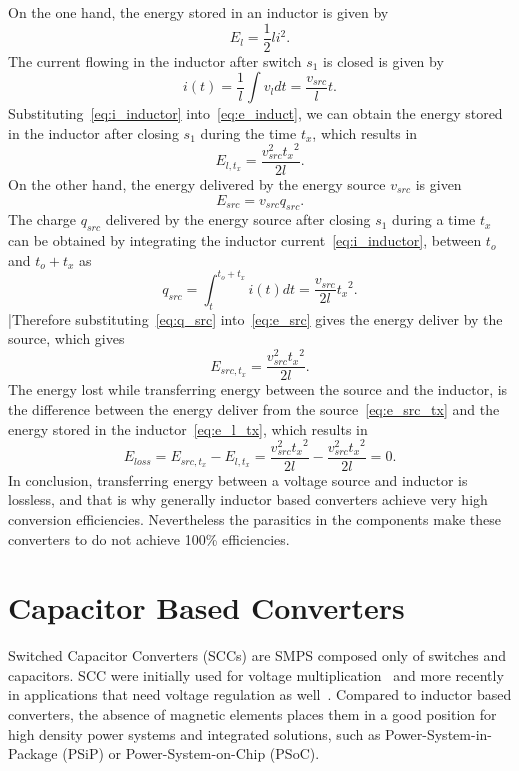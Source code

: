 On the one hand, the energy stored in an inductor is given by
\begin{equation}
E_l = \frac{1}{2} l i^2.
\label{eq:e_induct}
\end{equation}
The current flowing in the inductor after switch $s_1$ is closed is given by
\begin{equation}
i(t)= \frac{1}{l} \int v_l dt = \frac{v_{src}}{l}t.
\label{eq:i_inductor}
\end{equation}
Substituting~\eqref{eq:i_inductor} into~\eqref{eq:e_induct}, we can obtain the energy stored in the inductor after closing $s_1$ during the time $t_x$, which results in
\begin{equation}
E_{l,t_x}= \frac{v_{src}^2{t_x}^2}{2l} .
\label{eq:e_l_tx}
\end{equation}
On the other hand, the energy delivered by the energy source $v_{src}$ is given
\begin{equation}
E_{src} = v_{src} q_{src}.
\label{eq:e_src}
\end{equation}
The charge $q_{src}$ delivered by the energy source after closing $s_1$ during a time $t_x$ can be obtained by integrating the inductor current~\eqref{eq:i_inductor},  between $t_o$ and $t_o+t_x$ as
\begin{equation}
q_{src} = \int_t^{t_o+t_x} i(t) dt = \frac{v_{src}}{2l}{t_x}^2 .
\label{eq:q_src}
\end{equation}
|Therefore substituting~\eqref{eq:q_src} into~\eqref{eq:e_src} gives the energy deliver by the source, which gives
\begin{equation}
E_{src,t_x} = \frac{v_{src}^2{t_x}^2}{2l}.
\label{eq:e_src_tx}
\end{equation}
The energy lost while transferring energy between the source and the inductor, is the difference between the energy deliver from the source~\eqref{eq:e_src_tx} and the energy stored in the inductor~\eqref{eq:e_l_tx}, which results in
\begin{equation}
E_{loss} = E_{src,t_x} - E_{l,t_x} = \frac{v_{src}^2{t_x}^2}{2l} - \frac{v_{src}^2{t_x}^2}{2l} =0.
\label{eq:e_loss_l}
\end{equation}
In conclusion, transferring energy between a voltage source and inductor is lossless, and that is why generally inductor based converters achieve very high conversion efficiencies. Nevertheless the parasitics in the components make these converters to do not achieve 100\% efficiencies.

\section{Capacitor Based Converters }
Switched Capacitor Converters (SCCs) are SMPS composed only of switches and capacitors. SCC were initially used for voltage multiplication~\cite{30Cockcroft,44Waidelich,76Dickson} and more recently in applications that need voltage regulation as well~\cite{Ng:EECS-2011-94}. Compared to inductor based converters, the absence of magnetic elements places them in a good position for high density power systems and integrated solutions, such as Power-System-in-Package (PSiP) or Power-System-on-Chip (PSoC).

